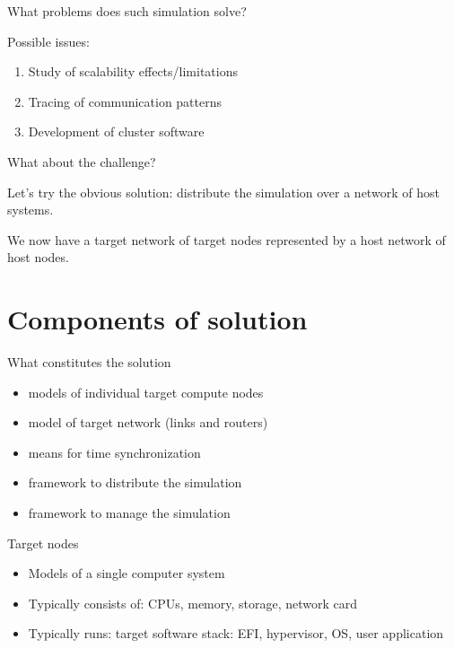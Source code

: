 \begin{frame}{What problems does such simulation solve?}

Possible issues:

\begin{enumerate}
    \item Study of scalability effects/limitations
    \item Tracing of communication patterns
    \item Development of cluster software
\end{enumerate}

\end{frame}

\begin{frame}{What about the challenge?}

Let's try the obvious solution: distribute the simulation over a network of host systems.

We now have a target network of target nodes represented by a host network of host nodes.

\end{frame}


\section{Components of solution}

\begin{frame}{What constitutes the solution}

\begin{itemize}
    \item models of individual target compute nodes
    \item model of target network (links and routers)
    \item means for time synchronization
    \item framework to distribute the simulation
    \item framework to manage the simulation
\end{itemize}

\end{frame}

\begin{frame}{Target nodes}

\begin{itemize}
\item Models of a single computer system
\item Typically consists of: CPUs, memory, storage, network card
\item Typically runs: target software stack: EFI, hypervisor, OS, user application
\end{itemize}

\end{frame}

